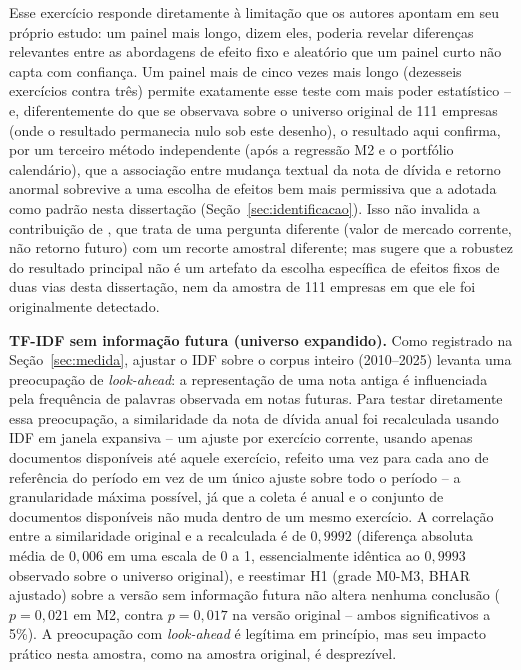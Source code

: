 \documentclass[a4paper,12pt]{report}
\begin{document}
Esse exercício responde diretamente à limitação que os autores apontam em seu próprio estudo: um painel mais longo, dizem eles, poderia revelar diferenças relevantes entre as abordagens de efeito fixo e aleatório que um painel curto não capta com confiança. Um painel mais de cinco vezes mais longo (dezesseis exercícios contra três) permite exatamente esse teste com mais poder estatístico -- e, diferentemente do que se observava sobre o universo original de 111 empresas (onde o resultado permanecia nulo sob este desenho), o resultado aqui confirma, por um terceiro método independente (após a regressão M2 e o portfólio calendário), que a associação entre mudança textual da nota de dívida e retorno anormal sobrevive a uma escolha de efeitos bem mais permissiva que a adotada como padrão nesta dissertação (Seção~\ref{sec:identificacao}). Isso não invalida a contribuição de , que trata de uma pergunta diferente (valor de mercado corrente, não retorno futuro) com um recorte amostral diferente; mas sugere que a robustez do resultado principal não é um artefato da escolha específica de efeitos fixos de duas vias desta dissertação, nem da amostra de 111 empresas em que ele foi originalmente detectado.

\textbf{TF-IDF sem informação futura (universo expandido).} Como registrado na Seção~\ref{sec:medida}, ajustar o IDF sobre o corpus inteiro (2010--2025) levanta uma preocupação de \textit{look-ahead}: a representação de uma nota antiga é influenciada pela frequência de palavras observada em notas futuras. Para testar diretamente essa preocupação, a similaridade da nota de dívida anual foi recalculada usando IDF em janela expansiva -- um ajuste por exercício corrente, usando apenas documentos disponíveis até aquele exercício, refeito uma vez para cada ano de referência do período em vez de um único ajuste sobre todo o período -- a granularidade máxima possível, já que a coleta é anual e o conjunto de documentos disponíveis não muda dentro de um mesmo exercício. A correlação entre a similaridade original e a recalculada é de $0{,}9992$ (diferença absoluta média de $0{,}006$ em uma escala de 0 a 1, essencialmente idêntica ao $0{,}9993$ observado sobre o universo original), e reestimar H1 (grade M0-M3, BHAR ajustado) sobre a versão sem informação futura não altera nenhuma conclusão ($p=0{,}021$ em M2, contra $p=0{,}017$ na versão original -- ambos significativos a 5\%). A preocupação com \textit{look-ahead} é legítima em princípio, mas seu impacto prático nesta amostra, como na amostra original, é desprezível.
\end{document}
